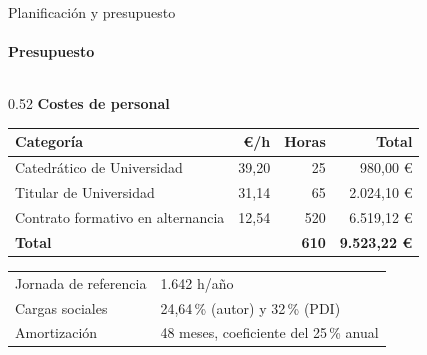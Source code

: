 \documentclass[aspectratio=169]{beamer}
\renewcommand{\tiny}{\fontsize{7}{8.5}\selectfont}
\begin{document}
\begin{frame}[t]{Planificación y presupuesto}
\framesubtitle{Presupuesto}
\vspace{0.2em}
\begin{columns}[T,onlytextwidth]
\begin{column}{0.52\textwidth}
  \centering
  {\scriptsize\textbf{\color{uc3mblue}Costes de personal}}\\[0.4em]
  {\scriptsize
  \begin{tabular}{@{}>{\raggedright\arraybackslash}p{2.9cm}rrr@{}}
  \toprule
  \textbf{Categoría} & \textbf{€/h} & \textbf{Horas} & \textbf{Total} \\
  \midrule
  Catedrático de Universidad        & 39,20 & 25  & 980,00 € \\
  Titular de Universidad            & 31,14 & 65  & 2.024,10 € \\
  Contrato formativo en alternancia & 12,54 & 520 & 6.519,12 € \\
  \midrule
  \textbf{Total} & & \textbf{610} & \textbf{9.523,22 €} \\
  \bottomrule
  \end{tabular}}

  \vspace{1.0em}
  {\tiny\color{black!65}
  \begin{tabular}{@{}l@{\hspace{0.6em}}l@{}}
  Jornada de referencia & 1.642 h/año \\
  Cargas sociales & 24,64\,\% (autor) y 32\,\% (PDI) \\
  Amortización & 48 meses, coeficiente del 25\,\% anual \\
  \end{tabular}}
\end{column}


\end{columns}
\end{frame}
\end{document}
